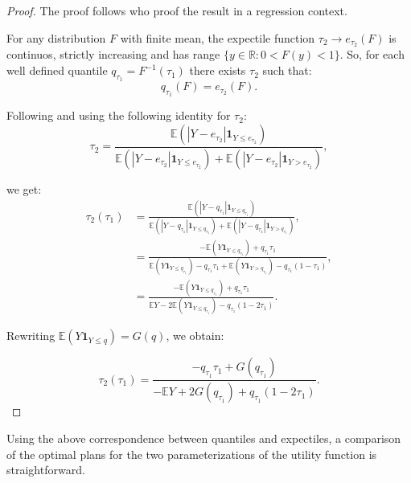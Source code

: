 \documentclass[preprint, 3p, authoryear]{elsarticle} %
\theoremstyle{definition}
\theoremstyle{definition}
\theoremstyle{definition}
\theoremstyle{definition}
\theoremstyle{remark}
\begin{document}
\begin{proof}
The proof follows \citet{yao1996} who proof the result in a regression context.

For any distribution \(F\) with finite mean, the expectile function \(\tau_2\rightarrow e_{\tau_2}(F)\) is continuos, strictly increasing and has range \(\{y\in\mathbb R: 0<F(y)<1\}\). So, for each well defined quantile \(q_{\tau_1}=F^{-1}(\tau_1)\) there exists \(\tau_2\) such that:
\[q_{\tau_1}(F) = e_{\tau_2}(F).\]

Following \citet{yao1996} and using the following identity for \(\tau_2\):
\[\tau_2 = \frac{\mathbb E(|Y-e_{\tau_2}|\mathbf 1_{Y\leq e_{\tau_2}})}{\mathbb E(|Y-e_{\tau_2}|\mathbf 1_{Y\leq e_{\tau_2}}) + \mathbb E(|Y-e_{\tau_2}|\mathbf 1_{Y> e_{\tau_2}})},\]

we get:
\begin{align*}\tau_2 (\tau_1) &= \frac{\mathbb E(|Y-q_{\tau_1}|\mathbf 1_{Y\leq q_{\tau_1}})}{\mathbb E(|Y-q_{\tau_1}|\mathbf 1_{Y\leq q_{\tau_1}}) + \mathbb E(|Y-q_{\tau_1}|\mathbf 1_{Y> q_{\tau_1}})},\\
&= \frac{-\mathbb E(Y\mathbf 1_{Y\leq q_{\tau_1}})+q_{\tau_1}\tau_1}{\mathbb E(Y\mathbf 1_{Y\leq q_{\tau_1}})-q_{\tau_1}\tau_1 + \mathbb E(Y\mathbf 1_{Y> q_{\tau_1}})-q_{\tau_1}(1-\tau_1)},\\
&= \frac{-\mathbb E(Y\mathbf 1_{Y\leq q_{\tau_1}})+q_{\tau_1}\tau_1}{\mathbb EY - 2\mathbb E(Y\mathbf 1_{Y\leq q_{\tau_1}})-q_{\tau_1}(1-2\tau_1)}.
\end{align*}

Rewriting \(\mathbb E(Y\mathbf 1_{Y\leq q}) = G(q)\), we obtain:

\[\tau_2 (\tau_1) = \frac{-q_{\tau_1}\tau_1 + G(q_{\tau_1})}{-\mathbb EY + 2G(q_{\tau_1})+q_{\tau_1}(1-2\tau_1)}.\]
\end{proof}

Using the above correspondence between quantiles and expectiles, a comparison of the optimal plans for the two parameterizations of the utility function is straightforward.
\end{document}
